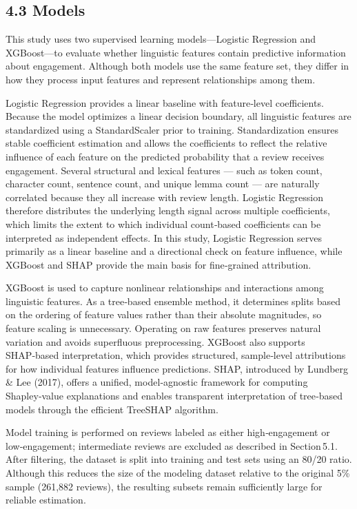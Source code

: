 \hypertarget{models}{%
\subsection{4.3 Models}\label{models}}

This study uses two supervised learning models---Logistic Regression and
XGBoost---to evaluate whether linguistic features contain predictive
information about engagement. Although both models use the same feature
set, they differ in how they process input features and represent
relationships among them.

Logistic Regression provides a linear baseline with feature‑level
coefficients. Because the model optimizes a linear decision boundary,
all linguistic features are standardized using a StandardScaler prior to
training. Standardization ensures stable coefficient estimation and
allows the coefficients to reflect the relative influence of each
feature on the predicted probability that a review receives engagement.
Several structural and lexical features --- such as token count,
character count, sentence count, and unique lemma count --- are
naturally correlated because they all increase with review length.
Logistic Regression therefore distributes the underlying length signal
across multiple coefficients, which limits the extent to which
individual count‑based coefficients can be interpreted as independent
effects. In this study, Logistic Regression serves primarily as a linear
baseline and a directional check on feature influence, while XGBoost and
SHAP provide the main basis for fine‑grained attribution.

XGBoost is used to capture nonlinear relationships and interactions
among linguistic features. As a tree‑based ensemble method, it
determines splits based on the ordering of feature values rather than
their absolute magnitudes, so feature scaling is unnecessary. Operating
on raw features preserves natural variation and avoids superfluous
preprocessing. XGBoost also supports SHAP‑based interpretation, which
provides structured, sample‑level attributions for how individual
features influence predictions. SHAP, introduced by Lundberg \& Lee
(2017), offers a unified, model‑agnostic framework for computing
Shapley‑value explanations and enables transparent interpretation of
tree‑based models through the efficient TreeSHAP algorithm.

Model training is performed on reviews labeled as either high‑engagement
or low‑engagement; intermediate reviews are excluded as described in
Section\,5.1. After filtering, the dataset is split into training and
test sets using an 80/20 ratio. Although this reduces the size of the
modeling dataset relative to the original 5\% sample (261,882 reviews),
the resulting subsets remain sufficiently large for reliable estimation.

